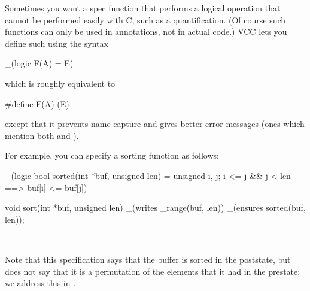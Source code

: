Sometimes you want a spec function that performs a logical operation
that cannot be performed easily with C, such as a quantification. (Of
course such functions can only be used in annotations, not in actual
code.) VCC lets you define such  using the syntax

\begin{VCC}
_(logic F(A) = E)
\end{VCC}
which is roughly equivalent to 
\begin{VCC}
#define F(A) (E)
\end{VCC}
except that it prevents
name capture and gives better error messages (\ie ones which mention
both  and ). 
 
For example, you can specify a sorting function as follows:
\begin{VCC}
_(logic bool sorted(int *buf, unsigned len) =
  \forall unsigned i, j; i <= j && j < len ==> buf[i] <= buf[j])

void sort(int *buf, unsigned len)
  _(writes \array_range(buf, len))
  _(ensures sorted(buf, len));
\end{VCC}
\

\noindent Note that this specification says that the buffer is
sorted in the poststate, but does not say that it is a permutation of
the elements that it had in the prestate; we address this in
.





